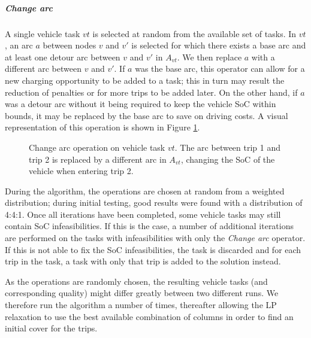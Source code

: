 \documentclass[]{article}
\begin{document}
\noindent\subparagraph{Change arc} A single vehicle task $vt$ is selected at random from the available set of tasks. In $vt$, an arc $a$ between nodes $v$ and $v'$ is selected for which there exists a base arc and at least one detour arc between $v$ and $v'$ in $A_{vt}$. We then replace $a$ with a different arc between $v$ and $v'$. If $a$ was the base arc, this operator can allow for a new charging opportunity to be added to a task; this in turn may result the reduction of penalties or for more trips to be added later. On the other hand, if $a$ was a detour arc without it being required to keep the vehicle SoC within bounds, it may be replaced by the base arc to save on driving costs. A visual representation of this operation is shown in Figure \ref{fig:changearc-vt}.
\begin{figure}[h]
  \centering
  \caption{Change arc operation on vehicle task $vt$. The arc between trip 1 and trip 2 is replaced by a different arc in $A_{vt}$, changing the SoC of the vehicle when entering trip 2.}
  \label{fig:changearc-vt}
\end{figure}

\noindent During the algorithm, the operations are chosen at random from a weighted distribution; during initial testing, good results were found with a distribution of 4:4:1. Once all iterations have been completed, some vehicle tasks may still contain SoC infeasibilities. If this is the case, a number of additional iterations are performed on the tasks with infeasibilities with only the \textit{Change arc} operator. If this is not able to fix the SoC infeasibilities, the task is discarded and for each trip in the task, a task with only that trip is added to the solution instead.

As the operations are randomly chosen, the resulting vehicle tasks (and corresponding quality) might differ greatly between two different runs. We therefore run the algorithm a number of times, thereafter allowing the LP relaxation to use the best available combination of columns in order to find an initial cover for the trips. 
\end{document}
